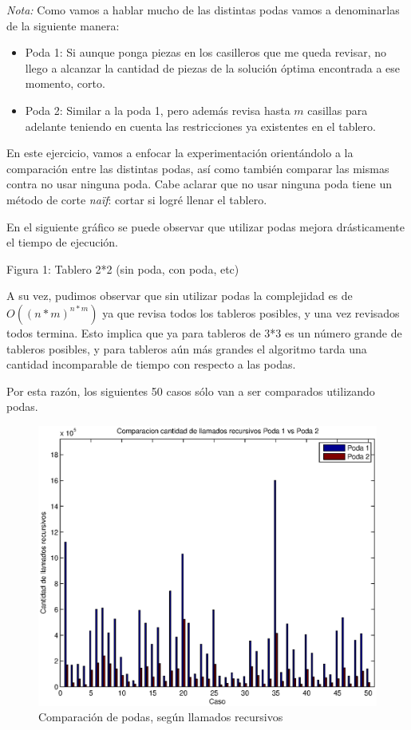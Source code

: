 \emph{Nota:} Como vamos a hablar mucho de las distintas podas vamos a denominarlas de la siguiente manera:
\begin{itemize}
\item Poda 1: Si aunque ponga piezas en los casilleros que me queda revisar, no llego a alcanzar la cantidad de piezas de la solución óptima encontrada a ese momento, corto.
\item Poda 2: Similar a la poda 1, pero además revisa hasta $m$ casillas para adelante teniendo en cuenta las restricciones ya existentes en el tablero.
\end{itemize}

En este ejercicio, vamos a enfocar la experimentación orientándolo a la comparación entre las distintas podas, así como también comparar las mismas contra no usar ninguna poda. Cabe aclarar que no usar ninguna poda tiene un método de corte \emph{naïf}: cortar si logré llenar el tablero.

En el siguiente gráfico se puede observar que utilizar podas mejora drásticamente el tiempo de ejecución.

Figura 1: Tablero 2*2 (sin poda, con poda, etc)

A su vez, pudimos observar que sin utilizar podas la complejidad es de $O((n*m)^{n*m})$ ya que revisa todos los tableros posibles, y una vez revisados todos termina. Esto implica que ya para tableros de 3*3 es un número grande de tableros posibles, y para tableros aún más grandes el algoritmo tarda una cantidad incomparable de tiempo con respecto a las podas.

Por esta razón, los siguientes 50 casos sólo van a ser comparados utilizando podas.

\begin{center}
  \begin{figure}[H]
    \includegraphics[width=\linewidth]{problema3/graficos/comparacion_podas1y2_llamados_recursivos.eps}
    \caption{Comparación de podas, según llamados recursivos}
    \label{fig:problema3-podas-llamados}
  \end{figure}
\end{center}

